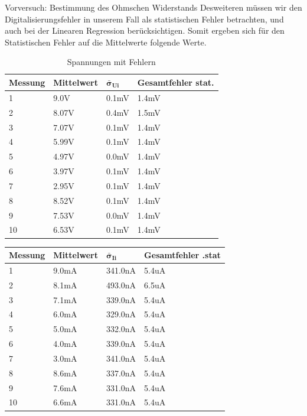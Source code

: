 \documentclass[twoside]{protokoll}
\begin{document}
\begin{aufgabe}{Vorversuch: Bestimmung des Ohmschen Widerstands}
Desweiteren müssen wir den Digitalisierungsfehler in unserem Fall als statistischen Fehler betrachten, und auch bei der Linearen Regression berücksichtigen. 
Somit ergeben sich für den Statistischen Fehler auf die Mittelwerte folgende Werte.

\begin{table}[H]
    \centering
    \begin{tabularx}{1\textwidth}{X X X X} %
        \toprule
        \textbf{Messung} & \textbf{Mittelwert} & $\pmb{\bar{\sigma}_{Ui}}$ & \textbf{Gesamtfehler stat.} \\
        \midrule
         
        1 & 9.0V & 0.1mV & 1.4mV \\
        2 & 8.07V & 0.4mV & 1.5mV \\
        3 & 7.07V & 0.1mV & 1.4mV \\
        4 & 5.99V & 0.1mV & 1.4mV \\
        5 & 4.97V & 0.0mV & 1.4mV \\
        6 & 3.97V & 0.1mV & 1.4mV \\
        7 & 2.95V & 0.1mV & 1.4mV \\
        8 & 8.52V & 0.1mV & 1.4mV \\
        9 & 7.53V & 0.0mV & 1.4mV \\
        10 & 6.53V & 0.1mV & 1.4mV \\
         
        \bottomrule
    \end{tabularx}
    \caption{Spannungen mit Fehlern}
    \label{tab:Tabelle 3}
\end{table}
\begin{table}[H]
    \centering
    \begin{tabularx}{1\textwidth}{X X X X}
        \toprule
        \textbf{Messung} & \textbf{Mittelwert} & $\pmb{\bar{\sigma}_{Ii}}$ & \textbf{Gesamtfehler .stat} \\
        \midrule
         
        1 & 9.0mA & 341.0nA & 5.4uA \\
        2 & 8.1mA & 493.0nA & 6.5uA \\
        3 & 7.1mA & 339.0nA & 5.4uA \\
        4 & 6.0mA & 329.0nA & 5.4uA \\
        5 & 5.0mA & 332.0nA & 5.4uA \\
        6 & 4.0mA & 339.0nA & 5.4uA \\
        7 & 3.0mA & 341.0nA & 5.4uA \\
        8 & 8.6mA & 337.0nA & 5.4uA \\
        9 & 7.6mA & 331.0nA & 5.4uA \\
        10 & 6.6mA & 331.0nA & 5.4uA \\


\end{tabularx}
\end{table}
\end{aufgabe}
\end{document}
